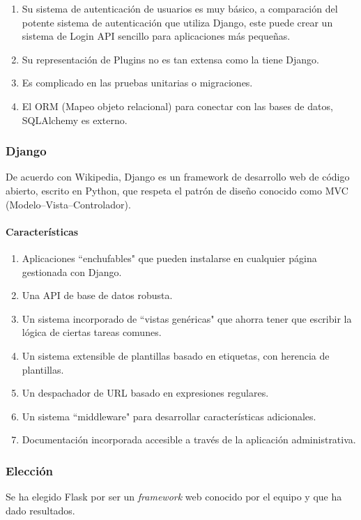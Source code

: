 \begin{enumerate}
    \item  Su sistema de autenticación de usuarios es muy básico, a comparación del potente sistema de autenticación que utiliza Django, este puede crear un sistema de Login API sencillo para aplicaciones más pequeñas.
    \item  Su representación de Plugins no es tan extensa como la tiene Django.
    \item  Es complicado en las pruebas unitarias o migraciones.
    \item El ORM (Mapeo objeto relacional) para conectar con las bases de datos, SQLAlchemy es externo.
\end{enumerate}


\subsubsection*{Django}

De acuerdo con Wikipedia\cite{wikipedia_django_2020}, Django es un framework de desarrollo web de código abierto, escrito en Python, que respeta el patrón de diseño conocido como MVC (Modelo–Vista–Controlador).

\paragraph*{Características}
\begin{enumerate}
    \item Aplicaciones ``enchufables" que pueden instalarse en cualquier página gestionada con Django.
    \item Una API de base de datos robusta.
    \item Un sistema incorporado de ``vistas genéricas" que ahorra tener que escribir la lógica de ciertas tareas comunes.
    \item Un sistema extensible de plantillas basado en etiquetas, con herencia de plantillas.
    \item Un despachador de URL basado en expresiones regulares.
    \item Un sistema ``middleware" para desarrollar características adicionales.
    \item Documentación incorporada accesible a través de la aplicación administrativa.
\end{enumerate}

\subsubsection*{Elección}

Se ha elegido Flask por ser un \textit{framework} web conocido por el equipo y que ha dado resultados.